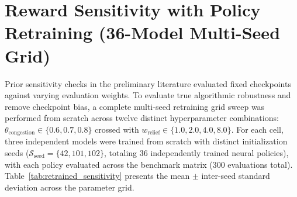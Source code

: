 \documentclass[12pt,a4paper,oneside]{report}
\begin{document}
\section{Reward Sensitivity with Policy Retraining (36-Model Multi-Seed Grid)}
\label{sec:reward}
\label{sec:res_reward}
Prior sensitivity checks in the preliminary literature evaluated fixed checkpoints against varying evaluation weights. To evaluate true algorithmic robustness and remove checkpoint bias, a complete multi-seed retraining grid sweep was performed from scratch across twelve distinct hyperparameter combinations: $\theta_{\mathrm{congestion}} \in \{0.6, 0.7, 0.8\}$ crossed with $w_{\mathrm{relief}} \in \{1.0, 2.0, 4.0, 8.0\}$. For each cell, three independent models were trained from scratch with distinct initialization seeds ($\mathcal{S}_{\mathrm{seed}} = \{42, 101, 102\}$, totaling 36 independently trained neural policies), with each policy evaluated across the benchmark matrix (300 evaluations total). Table~\ref{tab:retrained_sensitivity} presents the mean $\pm$ inter-seed standard deviation across the parameter grid.
\end{document}
